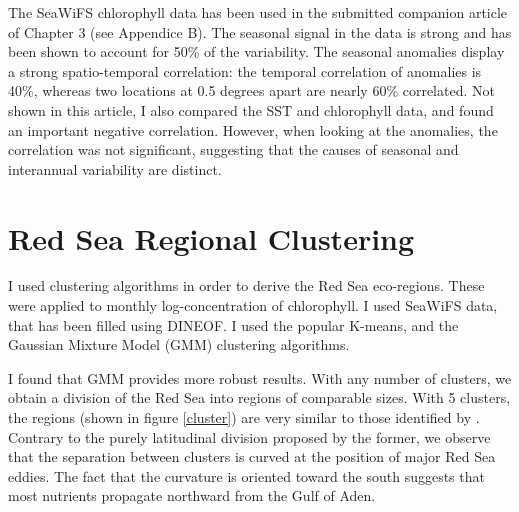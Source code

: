 The SeaWiFS chlorophyll data has been used in the submitted companion article
of Chapter 3 (see Appendice B).  The seasonal signal in the data is strong and
has been shown to account for 50\% of the variability. The seasonal anomalies
display a strong spatio-temporal correlation: the temporal correlation of
anomalies is 40\%, whereas two locations at 0.5 degrees apart are nearly 60\%
correlated. Not shown in this article, I also compared the SST and chlorophyll
data, and found an important negative correlation. However, when looking at the
anomalies, the correlation was not significant, suggesting that the causes of
seasonal and interannual variability are distinct.

\section{Red Sea Regional Clustering}

I used clustering algorithms in order to derive the Red Sea eco-regions. These
were applied to monthly log-concentration of chlorophyll. I used SeaWiFS data,
that has been filled using DINEOF. I used the popular K-means, and the Gaussian
Mixture Model (GMM) clustering algorithms.

I found that GMM provides more robust results. With any number of clusters, we
obtain a division of the Red Sea into regions of comparable sizes.  With 5
clusters, the regions (shown in figure \ref{cluster}) are very similar to those identified by
\citet{Raitsos2013}.  Contrary to the purely latitudinal division proposed by
the former, we observe that the separation between clusters is curved at the
position of major Red Sea eddies.  The fact that the curvature is oriented
toward the south suggests that most nutrients propagate northward from the Gulf
of Aden.

